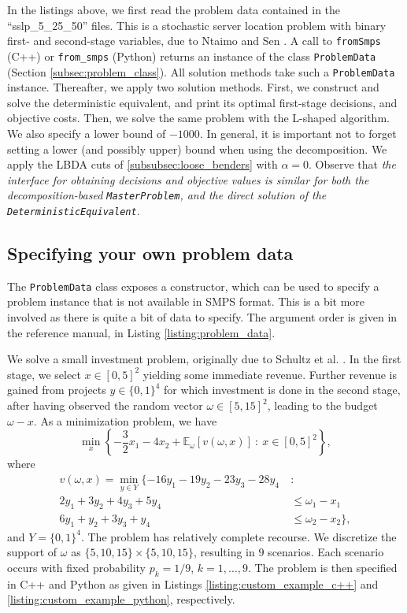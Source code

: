 \documentclass[12pt, english]{article}
\begin{document}
In the listings above, we first read the problem data contained in the ``sslp\_5\_25\_50'' files. This is a stochastic server location problem with binary first- and second-stage variables, due to Ntaimo and Sen \cite{ntaimo2005}.  A call to \texttt{fromSmps} (C++) or \texttt{from\_smps} (Python) returns an instance of the class \texttt{ProblemData} (Section \ref{subsec:problem_class}). All solution methods take such a \texttt{ProblemData} instance. Thereafter, we apply two solution methods. First, we construct and solve the deterministic equivalent, and print its optimal first-stage decisions, and objective costs. Then, we solve the same problem with the L-shaped algorithm. We also specify a lower bound of $-1000$. In general, it is important not to forget setting a lower (and possibly upper) bound when using the decomposition. We apply the LBDA cuts of \ref{subsubsec:loose_benders} with $\alpha = 0$. Observe that \emph{the interface for obtaining decisions and objective values is similar for both the decomposition-based \texttt{MasterProblem}, and the direct solution of the \texttt{DeterministicEquivalent}}.

\subsection{Specifying your own problem data}
\label{subsec:own_data_example}

The \texttt{ProblemData} class exposes a constructor, which can be used to specify a problem instance that is not available in SMPS format. This is a bit more involved as there is quite a bit of data to specify. The argument order is given in the reference manual, in Listing \ref{listing:problem_data}.

We solve a small investment problem, originally due to Schultz et al. \cite{schultz1998}. In the first stage, we select $x \in [0, 5]^2$ yielding some immediate revenue. Further revenue is gained from projects $y \in \{0, 1\}^4$ for which investment is done in the second stage, after having observed the random vector $\omega \in [5, 15]^2$, leading to the budget $\omega - x$. As a minimization problem, we have
\[ \min_x \left\{ -\frac{3}{2}x_1 -4 x_2 + \mathbb{E}_\omega [v(\omega, x)]~:~x \in [0, 5]^2 \right\}, \]
where
\[
\begin{split}
	v(\omega, x) = \min_{y \in Y} \{ -16y_1 -19y_2 -23y_3 - 28y_4~&: \\
							            2y_1 + 3y_2 + 4y_3 + 5y_4 &\le \omega_1 - x_1 \\
					                     6y_1 + y_2 + 3y_3 + y_4 &\le \omega_2 - x_2 \},
\end{split}
\]
and $Y = \{0, 1\}^4$. The problem has relatively complete recourse. We discretize the support of $\omega$ as $\{5, 10, 15\} \times \{5, 10, 15\}$, resulting in $9$ scenarios. Each scenario occurs with fixed probability $p_k = 1 / 9$, $k = 1, \ldots, 9$. The problem is then specified in C++ and Python as given in Listings \ref{listing:custom_example_c++} and \ref{listing:custom_example_python}, respectively.
\end{document}
